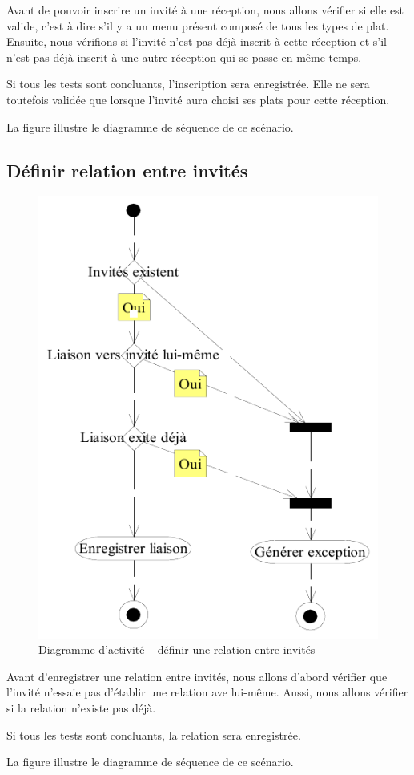 Avant de pouvoir inscrire un invité à une réception, nous allons vérifier si elle est valide, c'est à dire s'il y a un menu présent composé de tous les types de plat. Ensuite, nous vérifions si l'invité n'est pas déjà inscrit à cette réception et s'il n'est pas déjà inscrit à une autre réception qui se passe en même temps.

Si tous les tests sont concluants, l'inscription sera enregistrée. Elle ne sera toutefois validée que lorsque l'invité aura choisi ses plats pour cette réception.

La figure  illustre le diagramme de séquence de ce scénario.

\subsection{Définir relation entre invités}

\begin{figure}
  \centering
  \includegraphics[scale=.88]{IMG/da_definir_relation_entre_invites}
  \caption{Diagramme d'activité -- définir une relation entre invités}
  \label{img_da_definir_relation_entre_invites}
\end{figure}

Avant d'enregistrer une relation entre invités, nous allons d'abord vérifier que l'invité n'essaie pas d'établir une relation ave lui-même. Aussi, nous allons vérifier si la relation n'existe pas déjà.

Si tous les tests sont concluants, la relation sera enregistrée.

La figure  illustre le diagramme de séquence de ce scénario.
